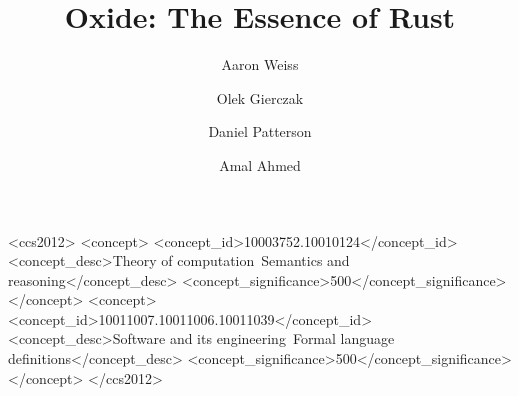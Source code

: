 \documentclass[acmsmall,nonacm]{acmart}
\begin{document}
\sloppy %

\title{Oxide: The Essence of Rust}


\author{Aaron Weiss}

\author{Olek Gierczak}

\author{Daniel Patterson}

\author{Amal Ahmed}

\begin{abstract}
  
\end{abstract}

\begin{CCSXML}
  <ccs2012>
  <concept>
  <concept_id>10003752.10010124</concept_id>
  <concept_desc>Theory of computation~Semantics and reasoning</concept_desc>
  <concept_significance>500</concept_significance>
  </concept>
  <concept>
  <concept_id>10011007.10011006.10011039</concept_id>
  <concept_desc>Software and its engineering~Formal language definitions</concept_desc>
  <concept_significance>500</concept_significance>
  </concept>
  </ccs2012>
\end{CCSXML}
\end{document}
